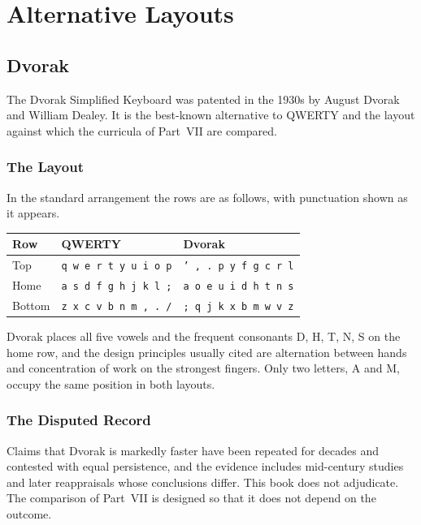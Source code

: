 \part{Alternative Layouts}

\chapter{Dvorak}
\label{ch:dvorak}

The Dvorak Simplified Keyboard was patented in the 1930s by August Dvorak and William Dealey.  It is the best-known alternative to QWERTY and the layout against which the curricula of Part~VII are compared.

\section{The Layout}

In the standard arrangement the rows are as follows, with punctuation shown as it appears.

\begin{center}
\begin{tabular}{@{}lll@{}}
\toprule
Row & QWERTY & Dvorak \\
\midrule
Top & \texttt{q w e r t y u i o p} & \texttt{' , . p y f g c r l} \\
Home & \texttt{a s d f g h j k l ;} & \texttt{a o e u i d h t n s} \\
Bottom & \texttt{z x c v b n m , . /} & \texttt{; q j k x b m w v z} \\
\bottomrule
\end{tabular}
\end{center}

Dvorak places all five vowels and the frequent consonants D, H, T, N, S on the home row, and the design principles usually cited are alternation between hands and concentration of work on the strongest fingers. Only two letters, A and M, occupy the same position in both layouts.

\section{The Disputed Record}

Claims that Dvorak is markedly faster have been repeated for decades and contested with equal persistence, and the evidence includes mid-century studies and later reappraisals whose conclusions differ.  This book does not adjudicate. The comparison of Part~VII is designed so that it does not depend on the outcome.

